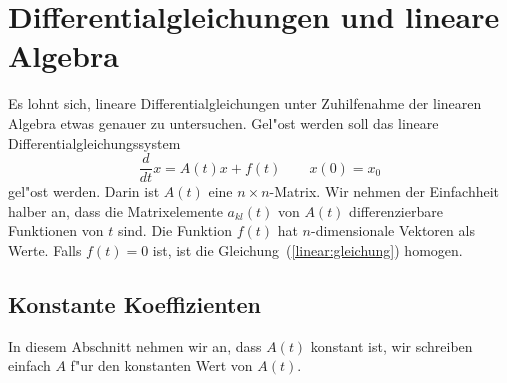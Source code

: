 %
%
%
\chapter{Differentialgleichungen und lineare Algebra\label{chapter:linear}}
\rhead{}
Es lohnt sich, lineare Differentialgleichungen unter Zuhilfenahme
der linearen Algebra etwas genauer zu untersuchen.
Gel"ost werden soll das lineare Differentialgleichungssystem
\begin{equation}
\frac{d}{dt}x = A(t)x + f(t)\qquad x(0)=x_0
\label{linear:gleichung}
\end{equation}
%
%
gel"ost werden.
Darin ist $A(t)$ eine $n\times n$-Matrix.
Wir nehmen der Einfachheit
halber an, dass die Matrixelemente $a_{kl}(t)$ von $A(t)$ differenzierbare
Funktionen von $t$ sind.
Die Funktion $f(t)$ hat $n$-dimensionale Vektoren als Werte.
Falls $f(t)=0$ ist, ist die Gleichung~(\ref{linear:gleichung}) 
homogen.

\section{Konstante Koeffizienten}
In diesem Abschnitt nehmen wir an, dass $A(t)$ konstant ist, wir schreiben
einfach $A$ f"ur den konstanten Wert von $A(t)$.
